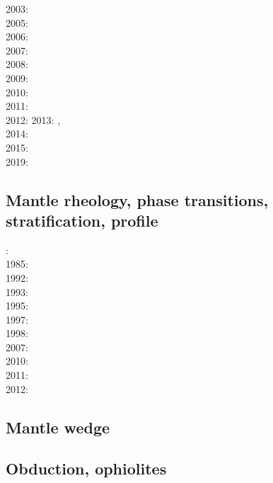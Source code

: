 2003: \cite{hapa03}\\
2005: \cite{taxn05}\cite{bupc05}\\
2006: \cite{beck06}\\
2007: \cite{nake07}\\
2008: \cite{tack08}\cite{chhl08}\\
2009: \cite{wodd09}\\
2010: \cite{bumb10}\\
2011: \cite{lowm11}\cite{rota11}\cite{woda11}\\
2012: \cite{bisa12}
2013: \cite{holj13}\cite{dadb13}\cite{toyd13},\cite{bogs13a}\cite{busa13}\cite{mika13}\\
2014: \cite{arfw14}\cite{helo14}\cite{crta14}\\
2015: \cite{thkp15}\\
2019: \cite{gult19}

\subsection*{Mantle rheology, phase transitions, stratification, profile}

: \cite{yusb82}\cite{chri82}\\
1985: \cite{chyu85}\\
1992: \cite{zhyh92}\\
1993: \cite{tasg93}\\
1995: \cite{zhyu95}\\
1997: \cite{mifo97}\\
1998: \cite{cava98}\\
2007: \cite{pazw07}\\
2010: \cite{kayy10}\\
2011: \cite{java11}\\
2012: \cite{tack12}

\subsection*{Mantle wedge}

\noindent
\cite{tosl78}
\cite{bigu01}
\cite{knva08}
\cite{leki09}
\cite{roms10}
\cite{ledg14}

\subsection*{Obduction, ophiolites}

